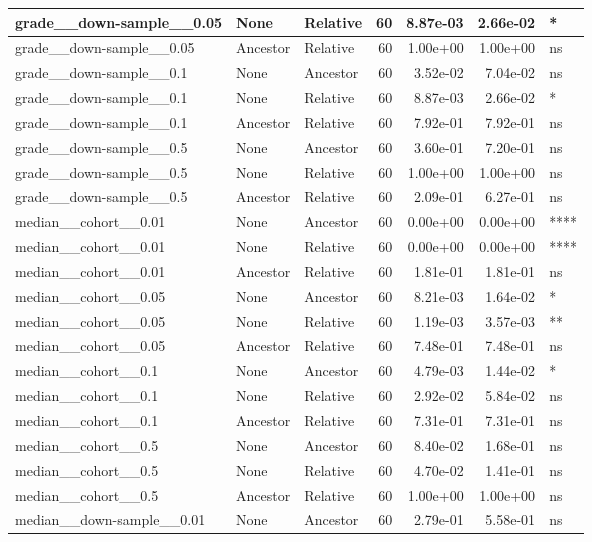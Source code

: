 \documentclass[
]{book}
\begin{document}
\begin{tabular}{l|l|l|r|r|r|l}
\hline
grade\_\_down-sample\_\_0.05 & None & Relative & 60 & 8.87e-03 & 2.66e-02 & *\\
\hline
grade\_\_down-sample\_\_0.05 & Ancestor & Relative & 60 & 1.00e+00 & 1.00e+00 & ns\\
\hline
grade\_\_down-sample\_\_0.1 & None & Ancestor & 60 & 3.52e-02 & 7.04e-02 & ns\\
\hline
grade\_\_down-sample\_\_0.1 & None & Relative & 60 & 8.87e-03 & 2.66e-02 & *\\
\hline
grade\_\_down-sample\_\_0.1 & Ancestor & Relative & 60 & 7.92e-01 & 7.92e-01 & ns\\
\hline
grade\_\_down-sample\_\_0.5 & None & Ancestor & 60 & 3.60e-01 & 7.20e-01 & ns\\
\hline
grade\_\_down-sample\_\_0.5 & None & Relative & 60 & 1.00e+00 & 1.00e+00 & ns\\
\hline
grade\_\_down-sample\_\_0.5 & Ancestor & Relative & 60 & 2.09e-01 & 6.27e-01 & ns\\
\hline
median\_\_cohort\_\_0.01 & None & Ancestor & 60 & 0.00e+00 & 0.00e+00 & ****\\
\hline
median\_\_cohort\_\_0.01 & None & Relative & 60 & 0.00e+00 & 0.00e+00 & ****\\
\hline
median\_\_cohort\_\_0.01 & Ancestor & Relative & 60 & 1.81e-01 & 1.81e-01 & ns\\
\hline
median\_\_cohort\_\_0.05 & None & Ancestor & 60 & 8.21e-03 & 1.64e-02 & *\\
\hline
median\_\_cohort\_\_0.05 & None & Relative & 60 & 1.19e-03 & 3.57e-03 & **\\
\hline
median\_\_cohort\_\_0.05 & Ancestor & Relative & 60 & 7.48e-01 & 7.48e-01 & ns\\
\hline
median\_\_cohort\_\_0.1 & None & Ancestor & 60 & 4.79e-03 & 1.44e-02 & *\\
\hline
median\_\_cohort\_\_0.1 & None & Relative & 60 & 2.92e-02 & 5.84e-02 & ns\\
\hline
median\_\_cohort\_\_0.1 & Ancestor & Relative & 60 & 7.31e-01 & 7.31e-01 & ns\\
\hline
median\_\_cohort\_\_0.5 & None & Ancestor & 60 & 8.40e-02 & 1.68e-01 & ns\\
\hline
median\_\_cohort\_\_0.5 & None & Relative & 60 & 4.70e-02 & 1.41e-01 & ns\\
\hline
median\_\_cohort\_\_0.5 & Ancestor & Relative & 60 & 1.00e+00 & 1.00e+00 & ns\\
\hline
median\_\_down-sample\_\_0.01 & None & Ancestor & 60 & 2.79e-01 & 5.58e-01 & ns\\

\end{tabular}
\end{document}
